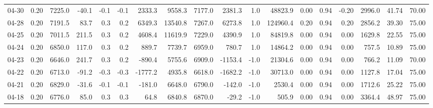 \begin{threeparttable}
{\begin{tabular}{lrrrrrrrrrrrrrrrrr}
  04-30 &     0.20 & 7225.0 &             -40.1 &              -0.1 &               -0.1 &             2333.3 &  9558.3 & 7177.0 &     2381.3 &                      1.0 &             48823.9 &       0.00 &      0.94 &          -0.20 &           2996.0 &           41.74 &                  70.00 \\
  04-28 &     0.20 & 7191.5 &              83.7 &               0.3 &                0.2 &             6349.3 & 13540.8 & 7267.0 &     6273.8 &                      1.0 &            124960.4 &       0.20 &      0.94 &           0.20 &           2856.2 &           39.30 &                  75.00 \\
  04-25 &     0.20 & 7011.5 &             211.5 &               0.3 &                0.2 &             4608.4 & 11619.9 & 7229.0 &     4390.9 &                      1.0 &             84819.8 &       0.00 &      0.94 &           0.00 &           1629.8 &           22.55 &                  75.00 \\
  04-24 &     0.20 & 6850.0 &             117.0 &               0.3 &                0.2 &              889.7 &  7739.7 & 6959.0 &      780.7 &                      1.0 &             14864.2 &       0.00 &      0.94 &           0.00 &            757.5 &           10.89 &                  75.00 \\
  04-23 &     0.20 & 6646.0 &             241.7 &               0.3 &                0.2 &             -890.4 &  5755.6 & 6909.0 &    -1153.4 &                     -1.0 &             21304.6 &       0.00 &      0.94 &           0.00 &            766.2 &           11.09 &                  70.00 \\
  04-22 &     0.20 & 6713.0 &             -91.2 &              -0.3 &               -0.3 &            -1777.2 &  4935.8 & 6618.0 &    -1682.2 &                     -1.0 &             30713.0 &       0.00 &      0.94 &           0.00 &           1127.8 &           17.04 &                  75.00 \\
  04-21 &     0.20 & 6829.0 &             -31.6 &              -0.1 &               -0.1 &             -181.0 &  6648.0 & 6790.0 &     -142.0 &                     -1.0 &              2530.4 &       0.00 &      0.94 &           0.00 &           1712.6 &           25.22 &                  75.00 \\
  04-18 &     0.20 & 6776.0 &              85.0 &               0.3 &                0.3 &               64.8 &  6840.8 & 6870.0 &      -29.2 &                     -1.0 &               505.9 &       0.00 &      0.94 &           0.00 &           3364.4 &           48.97 &                  75.00 \\

\end{tabular}}
\end{threeparttable}
